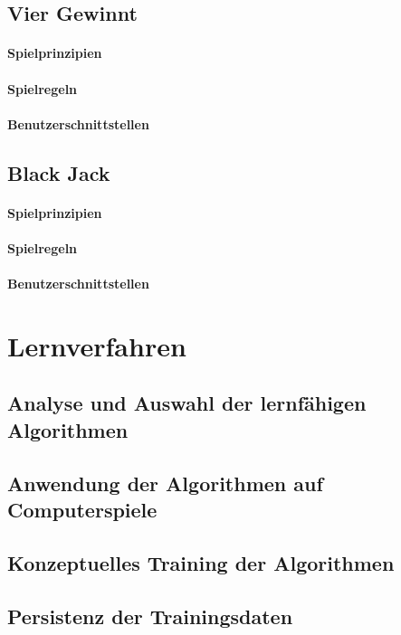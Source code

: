 \subsection{Vier Gewinnt}
\paragraph{Spielprinzipien}
\paragraph{Spielregeln}
\paragraph{Benutzerschnittstellen}

\subsection{Black Jack}
\paragraph{Spielprinzipien}
\paragraph{Spielregeln}
\paragraph{Benutzerschnittstellen}




\section{Lernverfahren}
\label{sec:lernverfahren}

\subsection{Analyse und Auswahl der lernfähigen Algorithmen}

\subsection{Anwendung der Algorithmen auf Computerspiele}

\subsection{Konzeptuelles Training der Algorithmen}

\subsection{Persistenz der Trainingsdaten}